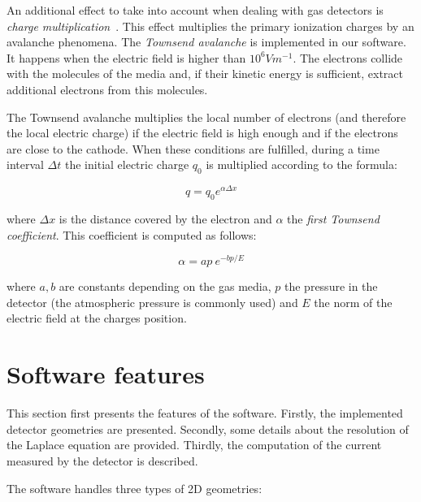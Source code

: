 \documentclass[11pt]{article}
\begin{document}
	An additional effect to take into account  when dealing with gas detectors is
	\textit{charge multiplication}~\cite{lphy2236}. This effect
	multiplies the primary ionization charges by an avalanche phenomena.
	The \textit{Townsend avalanche} is implemented in our software. It happens
	when the electric field is higher than $10^6Vm^{-1}$. The electrons collide
	with the molecules of the media and, if their kinetic energy is sufficient,
	extract additional electrons from this molecules.

	The Townsend avalanche multiplies the local number of electrons (and therefore the local electric
	charge) if the electric field is high enough and if the electrons are close
	to the cathode. When these conditions are fulfilled, during a time interval
	$\Delta t$ the initial electric charge $q_0$ is multiplied
	according to the formula:

	\begin{equation}
		q = q_0 e^{\alpha \Delta x}
		\label{eq:townsend}
	\end{equation}

	where $\Delta x$ is the distance covered by the electron and $\alpha$ the
	\textit{first Townsend coefficient}. This coefficient is computed as follows:

	\[\alpha = ap \ e^{-bp/E}\]

	where $a, b$ are constants depending on the gas media, $p$ the pressure in
	the detector (the atmospheric pressure is commonly used) and $E$ the norm
	of the electric field at the charges position.

\section{Software features}
\label{sec:features}

	This section first presents the features of the software. Firstly,
	the implemented detector geometries are presented. Secondly, some details
	about the resolution of the Laplace equation are provided. Thirdly, the
	computation of the current measured by the detector is described.

	The software handles three types of 2D geometries:
\end{document}
